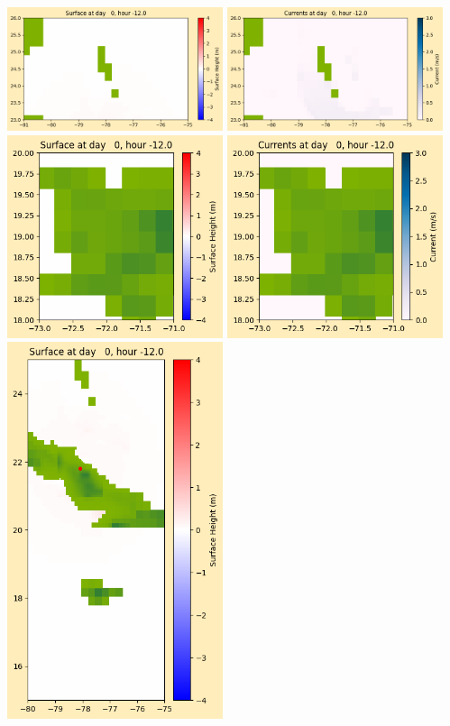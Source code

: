 \documentclass[11pt]{article}
\begin{document}
\vskip 10pt 
\includegraphics[width=0.475\textwidth]{frame0010fig1003.png}
\includegraphics[width=0.475\textwidth]{frame0010fig1004.png}
\vskip 10pt 
\includegraphics[width=0.475\textwidth]{frame0010fig1005.png}
\includegraphics[width=0.475\textwidth]{frame0010fig1006.png}
\vskip 10pt 
\includegraphics[width=0.475\textwidth]{frame0010fig1007.png}
\end{document}
